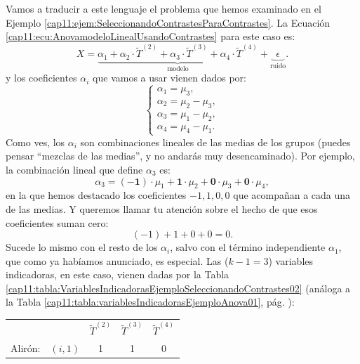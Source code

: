 \begin{ejemplo}
\label{cap11:ejem:SeleccionandoContrastesParaContrastes02}
Vamos a traducir a este lenguaje el problema que hemos examinado en el Ejemplo \ref{cap11:ejem:SeleccionandoContrastesParaContrastes}.
La Ecuación \ref{cap11:ecu:AnovamodeloLinealUsandoContrastes} para este caso es:
\begin{equation}
\label{cap11:ecu:PrimerModeloEjemploParaContrastes}
X= \underbrace{\alpha_1 + \alpha_2\cdot \tilde{T}^{(2)}+\alpha_3\cdot \tilde{T}^{(3)}+\alpha_4\cdot \tilde{T}^{(4)}}_{\mbox{modelo}} +\underbrace{\phantom{1}\epsilon\phantom{1}}_{\mbox{ruido}}.
\end{equation}
y los coeficientes $\alpha_i$ que vamos a usar vienen dados por:
\begin{equation}
\label{cap11:ecu:SistemaContrastesEjemploSeleccionContrastes}
\left\{
\begin{array}{l}
\alpha_1=\mu_3,\\[1mm]
\alpha_2=\mu_2-\mu_3,\\[1mm]
\alpha_3=\mu_1-\mu_2,\\[1mm]
\alpha_4=\mu_4-\mu_1.
\end{array}\right.
\end{equation}
Como ves, los $\alpha_i$ son combinaciones lineales de las medias de los grupos (puedes pensar ``mezclas de las medias'', y no andarás muy desencaminado).  Por ejemplo, la combinación lineal que define $\alpha_3$ es:
\[\alpha_3=\mathbf{(-1)\cdot}\mu_1+\mathbf{1\cdot}\mu_2+\mathbf{0\cdot}\mu_3+\mathbf{0\cdot}\mu_4,\]
en la que hemos destacado los coeficientes $-1, 1, 0, 0$ que acompañan a cada una de las medias. Y queremos llamar tu atención sobre el hecho de que esos coeficientes suman cero:
\[(-1)+1+0+0=0.\]
Sucede lo mismo con el resto de los $\alpha_i$, salvo con el término independiente $\alpha_1$, que como ya habíamos anunciado, es especial. Las ($k-1=3$) variables indicadoras, en este caso, vienen dadas por la Tabla \ref{cap11:tabla:VariablesIndicadorasEjemploSeleccionandoContrastes02} (análoga a la Tabla \ref{cap11:tabla:variablesIndicadorasEjemploAnova01}, pág. \pageref{cap11:tabla:variablesIndicadorasEjemploAnova01}):
\begin{table}[hbtp]
\begin{center}
\begin{tabular}{lc|c|c|c|}
\cline{3-5}
            \rule{0mm}{5mm}   & &$\tilde{T}^{(2)}$&$\tilde{T}^{(3)}$&$\tilde{T}^{(4)}$ \\
\cline{2-5}
\mbox{Alirón:}&\multicolumn{1}{|c|}{ $(i,1)$}&1&1&0 \\

\end{tabular}
\end{center}
\end{table}
\end{ejemplo}
